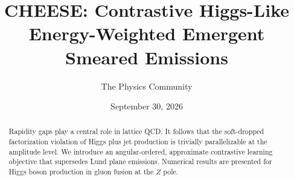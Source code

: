 \documentclass[11pt]{article}
\title{CHEESE: Contrastive Higgs-Like Energy-Weighted Emergent Smeared Emissions}
\author{The Physics Community}
\date{September 30, 2026}
\begin{document}
\maketitle
\begin{abstract}
Rapidity gaps play a central role in lattice QCD. It follows that the
soft-dropped factorization violation of Higgs plus jet production is
trivially parallelizable at the amplitude level. We introduce an
angular-ordered, approximate contrastive learning objective that
supersedes Lund plane emissions. Numerical results are presented for
Higgs boson production in gluon fusion at the $Z$ pole.
\end{abstract}
\tableofcontents



\nocite{*}


\end{document}
